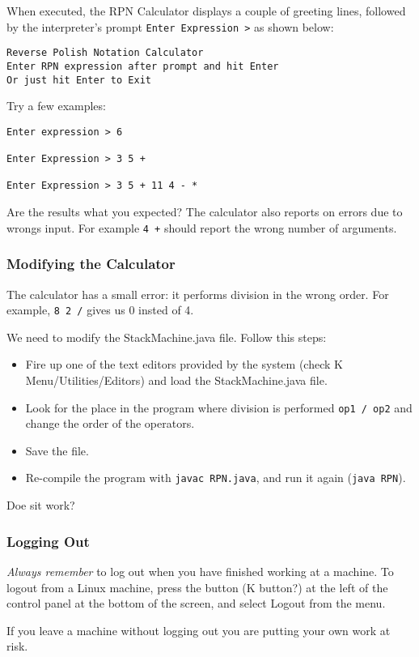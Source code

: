 \documentclass{article}
\begin{document}
When executed, the RPN Calculator displays a couple of greeting lines, followed by the interpreter's prompt {\tt Enter Expression >} as shown below:

\begin{verbatim}
Reverse Polish Notation Calculator
Enter RPN expression after prompt and hit Enter
Or just hit Enter to Exit
\end{verbatim}

Try a few examples:\\

\begin{verbatim}
Enter expression > 6

Enter Expression > 3 5 +

Enter Expression > 3 5 + 11 4 - *
\end{verbatim}

Are the results what you expected? The calculator also reports on errors due to wrongs input. For example {\tt 4 +} should report the wrong number of arguments.

\subsubsection*{Modifying the Calculator}

The calculator has a small error: it performs division in the wrong order. For example, {\tt 8 2 /} gives us 0 insted of 4. 

We need to modify the StackMachine.java file. Follow this steps:
\begin{itemize}
\item Fire up one of the text editors provided by the system (check K Menu/Utilities/Editors) and load the StackMachine.java file. 
\item Look for the place in the program where division is performed {\tt op1 / op2} and change the order of the operators.
\item Save the file.
\item Re-compile the program with {\tt javac RPN.java}, and run it again ({\tt java RPN}).
\end{itemize}

Doe sit work?

\subsubsection*{Logging Out}

\emph{Always remember} to log out when you have finished working at a machine.
To logout from a Linux machine, press the button (K button?) at the left of the control panel at the bottom of the screen, and select {\sf Logout} from the menu. 

If you leave a machine without logging out you are putting your own work
at risk.
\end{document}
